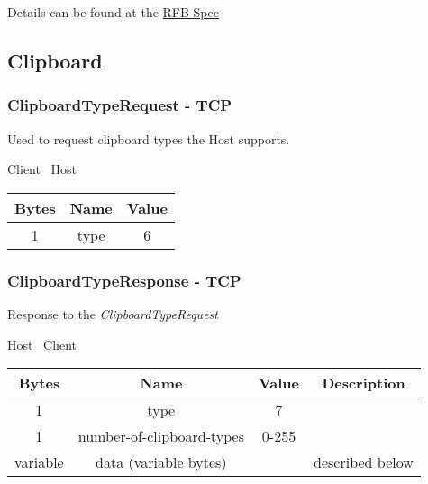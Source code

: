 Details can be found at the \href{https://github.com/rfbproto/rfbproto/blob/master/rfbproto.rst#keyevent}{RFB Spec}

\subsection{Clipboard} %

\subsubsection{ClipboardTypeRequest - TCP}

Used to request clipboard types the Host supports.

\begin{center}
    Client \textrightarrow\ Host\\
    \begin{tabular}{|c|c|c|}
        \hline
        \textbf{Bytes} & \textbf{Name} & \textbf{Value} \\
        \hline
        1              & type          & 6              \\
        \hline
    \end{tabular}
\end{center}

\subsubsection{ClipboardTypeResponse - TCP}

Response to the \emph{ClipboardTypeRequest}

\begin{center}
    Host \textrightarrow\ Client\\
    \begin{tabular}{|c|c|c|c|}
        \hline
        \textbf{Bytes} & \textbf{Name}             & \textbf{Value} & \textbf{Description} \\
        \hline
        1              & type                      & 7              &                      \\
        \hline
        1              & number-of-clipboard-types & 0-255          &                      \\
        \hline
        variable       & data (variable bytes)     &                & described below      \\
        \hline
    \end{tabular}
\end{center}

